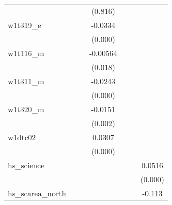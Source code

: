 {\begin{tabular}{l*{6}{c}}
            &                     &                     &     (0.816)         &                     &                     &                     \\
[1em]
w1t319\_e    &                     &                     &     -0.0334\sym{***}&                     &                     &                     \\
            &                     &                     &     (0.000)         &                     &                     &                     \\
[1em]
w1t116\_m    &                     &                     &    -0.00564\sym{**} &                     &                     &                     \\
            &                     &                     &     (0.018)         &                     &                     &                     \\
[1em]
w1t311\_m    &                     &                     &     -0.0243\sym{***}&                     &                     &                     \\
            &                     &                     &     (0.000)         &                     &                     &                     \\
[1em]
w1t320\_m    &                     &                     &     -0.0151\sym{***}&                     &                     &                     \\
            &                     &                     &     (0.002)         &                     &                     &                     \\
[1em]
w1dtc02     &                     &                     &      0.0307\sym{***}&                     &                     &                     \\
            &                     &                     &     (0.000)         &                     &                     &                     \\
[1em]
hs\_science  &                     &                     &                     &                     &                     &      0.0516\sym{***}\\
            &                     &                     &                     &                     &                     &     (0.000)         \\
[1em]
hs\_scarea\_north&                     &                     &                     &                     &                     &      -0.113\sym{***}\\

\end{tabular}}
